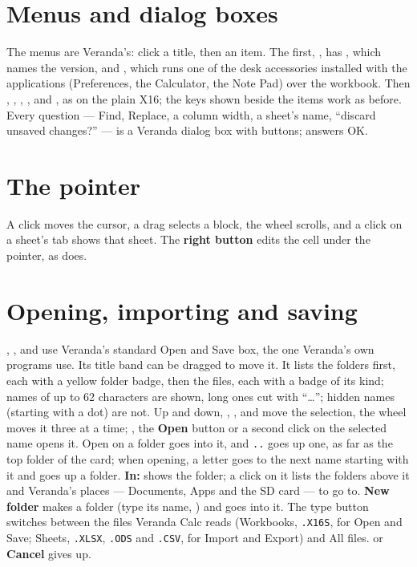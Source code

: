 \section{Menus and dialog boxes}

The menus are Veranda's: click a title, then an item. The first,
, has , which names
the version, and , which runs one of the desk
accessories installed with the applications (Preferences, the
Calculator, the Note Pad) over the workbook. Then ,
, , ,  and
, as on the plain X16; the keys shown beside the items
work as before. Every question --- Find, Replace, a column width, a
sheet's name, ``discard unsaved changes?'' --- is a Veranda dialog box with
buttons;  answers OK.

\section{The pointer}

A click moves the cursor, a drag selects a block, the wheel scrolls, and a
click on a sheet's tab shows that sheet. The \textbf{right button} edits
the cell under the pointer, as  does.

\section{Opening, importing and saving}

, ,  and  use Veranda's standard Open and Save
box, the one Veranda's own programs use. Its title band can be dragged
to move it. It lists the folders first, each with a yellow folder badge,
then the files, each with a badge of its kind; names of up to 62
characters are shown, long ones cut with ``\ldots''; hidden names
(starting with a dot) are not. Up and down, , ,
 and  move the selection, the wheel moves it three at a
time; , the \textbf{Open} button or a second click on the
selected name opens it. Open on a folder goes into it, and \texttt{..}
goes up one, as far as the top folder of the card; when opening, a letter
goes to the next name starting with it and  goes up a
folder. \textbf{In:} shows the folder; a click on it lists the folders
above it and Veranda's places --- Documents, Apps and the SD card --- to go
to. \textbf{New folder} makes a folder (type its name, ) and
goes into it. The type button switches between the files Veranda Calc
reads (\textsf{Workbooks}, \texttt{.X16S}, for Open and Save; \textsf{Sheets},
\texttt{.XLSX}, \texttt{.ODS} and \texttt{.CSV}, for Import
and Export) and \textsf{All files}.  or \textbf{Cancel} gives
up.


